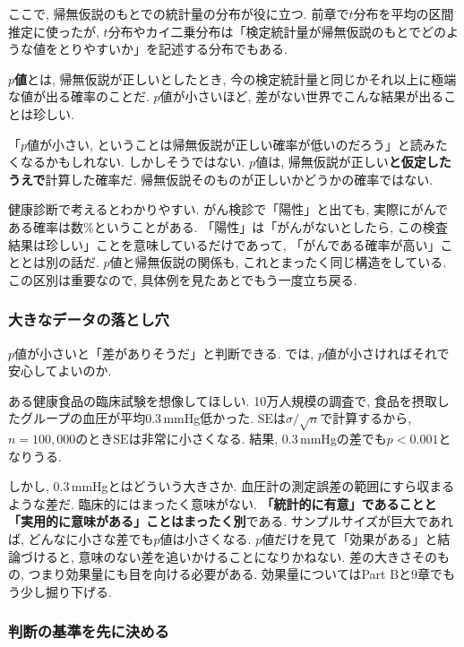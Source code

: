     ここで, 帰無仮説のもとでの統計量の分布が役に立つ.
    前章で$t$分布を平均の区間推定に使ったが, $t$分布やカイ二乗分布は「検定統計量が帰無仮説のもとでどのような値をとりやすいか」を記述する分布でもある.

    \textbf{$p$値}とは, 帰無仮説が正しいとしたとき, 今の検定統計量と同じかそれ以上に極端な値が出る確率のことだ.
    $p$値が小さいほど, 差がない世界でこんな結果が出ることは珍しい.

    「$p$値が小さい, ということは帰無仮説が正しい確率が低いのだろう」と読みたくなるかもしれない.
    しかしそうではない.
    $p$値は, 帰無仮説が正しい\textbf{と仮定したうえで}計算した確率だ.
    帰無仮説そのものが正しいかどうかの確率ではない.

    健康診断で考えるとわかりやすい.
    がん検診で「陽性」と出ても, 実際にがんである確率は数\%ということがある.
    「陽性」は「がんがないとしたら, この検査結果は珍しい」ことを意味しているだけであって,
    「がんである確率が高い」こととは別の話だ.
    $p$値と帰無仮説の関係も, これとまったく同じ構造をしている.
    この区別は重要なので, 具体例を見たあとでもう一度立ち戻る.

    \subsubsection*{大きなデータの落とし穴}

    $p$値が小さいと「差がありそうだ」と判断できる.
    では, $p$値が小さければそれで安心してよいのか.

    ある健康食品の臨床試験を想像してほしい.
    10万人規模の調査で, 食品を摂取したグループの血圧が平均0.3\,mmHg低かった.
    $\mathrm{SE}$は$\sigma / \sqrt{n}$で計算するから, $n = 100{,}000$のとき$\mathrm{SE}$は非常に小さくなる.
    結果, 0.3\,mmHgの差でも$p < 0.001$となりうる.

    しかし, 0.3\,mmHgとはどういう大きさか.
    血圧計の測定誤差の範囲にすら収まるような差だ.
    臨床的にはまったく意味がない.
    \textbf{「統計的に有意」であることと「実用的に意味がある」ことはまったく別}である.
    サンプルサイズが巨大であれば, どんなに小さな差でも$p$値は小さくなる.
    $p$値だけを見て「効果がある」と結論づけると, 意味のない差を追いかけることになりかねない.
    差の大きさそのもの, つまり効果量にも目を向ける必要がある.
    効果量についてはPart Bと9章でもう少し掘り下げる.

    \subsubsection*{判断の基準を先に決める}

